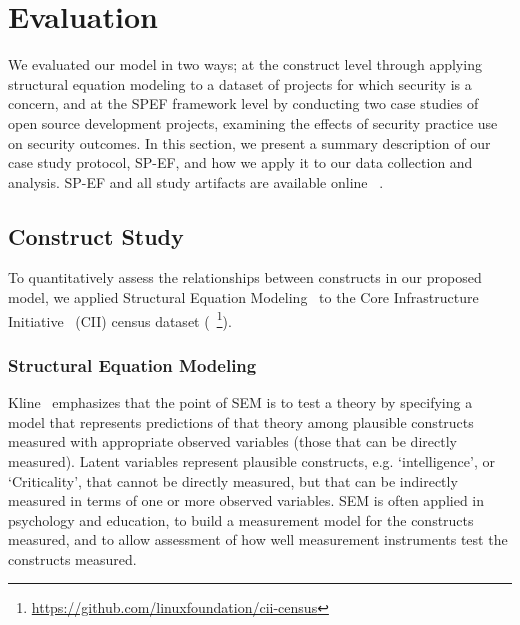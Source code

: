 \section{Evaluation}
\label{sec:evaluation}

We evaluated our model in two ways; at the construct level through applying structural equation modeling to a dataset of projects for which security is a concern, and at the SPEF framework level by conducting two case studies of open source development projects, examining the effects of security practice use on security outcomes. In this section, we present a summary description of our case study protocol, SP-EF, and how we apply it to our data collection and analysis. SP-EF and all study artifacts are available online ~\cite{morrison2016spef}. 

\subsection{Construct Study}

To quantitatively assess the relationships between constructs in our proposed model, we applied Structural Equation Modeling~\cite{kline2015principles} to the Core Infrastructure Initiative~\cite{lf2016cii} (CII) census dataset (~\footnote{\url{https://github.com/linuxfoundation/cii-census}}). 

\subsubsection{Structural Equation Modeling}

Kline~\cite{kline2015principles} emphasizes that the point of SEM is to test a theory by specifying a model that represents predictions of that theory among plausible constructs measured with appropriate observed variables (those that can be directly measured). Latent variables represent plausible constructs, e.g. ‘intelligence’, or ‘Criticality’, that cannot be directly measured, but that can be indirectly measured in terms of one or more observed variables. SEM is often applied in psychology and education, to build a measurement model for the constructs measured, and to allow assessment of how well measurement instruments test the constructs measured. 

